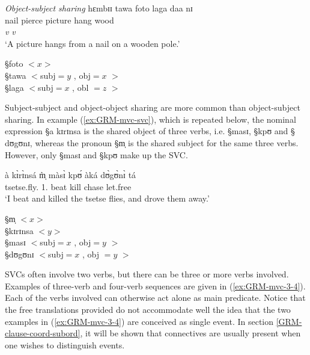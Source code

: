 \begin{exe}
\ex\label{ex:GRM-arg-sh-objsubj}{\it Object-subject sharing}
\glll  hɛmbɪɪ tawa foto laga daa nɪ\\
nail pierce picture hang wood  {\postp}\\
{} {\it v} {}  {\it v} \\
 \glt `A picture hangs from a nail on a wooden pole.'

{\S foto} $<x>$\\
{\S tawa} $<${\sc subj}$ =  y$ ,  {\sc obj}$=x$  $> $\\
{\S laga} $<${\sc subj}$ = x$ , {\sc obl} $= z $  $ >$\\
\end{exe}



Subject-subject and object-object sharing are more common than object-subject
sharing. In example
(\ref{ex:GRM-mvc-svc}), which is repeated below, the nominal expression {\S a 
 kɪrɪnsa} is the shared object of three verbs, i.e. {\S masɪ}, {\S kpʊ} and {\S
dʊgʊnɪ}, whereas the pronoun {\S m̩} is the shared subject for the same three
verbs. However, only {\S masɪ} and {\S kpʊ}  make up the SVC. 

\begin{exe}
\gll à   	kɪ̀rɪ̀nsá    	m̩̀    	màsɪ̀ 	kpʊ́  	àká  	dʊ̀gʊ̀nɪ̀ tá\\
{\art}	tsetse.fly.{\pl} 	{1.\sg}     	beat 	kill 	{\conn} 
chase  	     let.free\\
\glt `I beat and killed the tsetse flies, and drove them away.'

{\S m̩} $<x>$\\
{\S kɪrɪnsa} $<y>$\\
{\S masɪ} $<${\sc subj}$ =  x$ ,  {\sc obj}$=y$  $> $\\
{\S dʊgʊnɪ} $<${\sc subj}$ = x$ , {\sc obj} $= y $  $ >$\\
\end{exe}

SVCs often involve two verbs, but there can be three or more verbs involved. 
Examples of three-verb and four-verb sequences are given in
(\ref{ex:GRM-mvc-3-4}). Each of the verbs involved can otherwise act alone as
main
predicate. Notice that the free translations provided do not accommodate well
the idea that
the two examples in (\ref{ex:GRM-mvc-3-4}) are conceived as single event.
In section \ref{GRM-clause-coord-subord},  it will be shown that connectives
are usually present  when one wishes to distinguish events.


